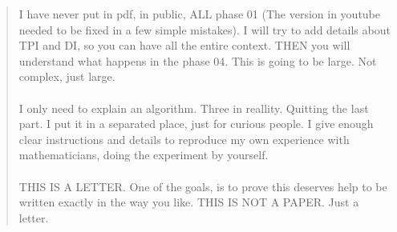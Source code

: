 \begin{abstract}
	
	
	
	\noindent
	I have never put in pdf, in public, ALL phase 01 (The version in youtube needed to be fixed in a few simple mistakes). I will try to add details about TPI and DI, so you can have all the entire context. THEN you will understand what happens in the phase 04. This is going to be large. Not complex, just large.
	\\\\
	
	\noindent
	I only need to explain an algorithm. Three in reallity. Quitting the last part. I put it in a separated place, just for curious people. I give enough clear instructions and details to reproduce my own experience with mathematicians, doing the experiment by yourself.
	\\\\
	
	\noindent
	THIS IS A LETTER. One of the goals, is to prove this deserves help to be written exactly in the way you like. THIS IS NOT A PAPER. Just a letter.
	
	

\end{abstract}